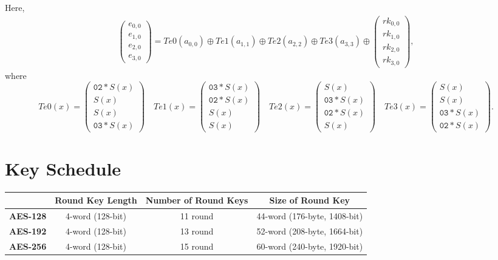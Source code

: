 \newpage
\begin{center}

\end{center}
Here, \begin{align*}
	\begin{pmatrix} e_{0,0} \\ e_{1,0} \\ e_{2,0} \\ e_{3,0} 
	\end{pmatrix} = Te0(a_{0,0})\oplus Te1(a_{1,1}) \oplus Te2(a_{2,2}) \oplus Te3(a_{3,3}) \oplus
	\begin{pmatrix} rk_{0,0} \\ rk_{1,0} \\ rk_{2,0} \\ rk_{3,0}
	\end{pmatrix},
\end{align*} where \[
Te0(x)=\begin{pmatrix}\texttt{02} * S(x) \\ S(x) \\ S(x) \\ \texttt{03} * S(x)
\end{pmatrix}\quad Te1(x)=\begin{pmatrix}\texttt{03} * S(x) \\ \texttt{02} * S(x) \\ S(x) \\ S(x)
\end{pmatrix}\quad Te2(x)=\begin{pmatrix}S(x) \\ \texttt{03} * S(x) \\ \texttt{02} * S(x) \\ S(x)
\end{pmatrix}\quad Te3(x)=\begin{pmatrix}S(x) \\ S(x) \\ \texttt{03} * S(x) \\ \texttt{02} * S(x)
\end{pmatrix}.
\]

\newpage
\section{Key Schedule}

\begin{table}[h!]\centering
{\begin{tabular}{c|c|c|c} \toprule[1.2pt]
	& \textbf{Round Key Length} & \textbf{Number of Round Keys} & \textbf{Size of Round Key} \\ \hline\hline
	\textbf{AES-128} & 4-word (128-bit) & 11 round & 44-word (176-byte, 1408-bit) \\ \hline
	\textbf{AES-192} & 4-word (128-bit) & 13 round & 52-word (208-byte, 1664-bit) \\ \hline
	\textbf{AES-256} & 4-word (128-bit) & 15 round & 60-word (240-byte, 1920-bit) \\ \bottomrule[1.2pt]
\end{tabular}}
\end{table}

